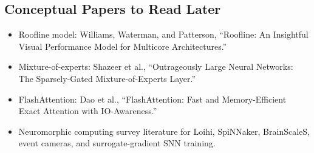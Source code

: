 \subsection*{Conceptual Papers to Read Later}
\begin{itemize}[leftmargin=*]
  \item Roofline model: Williams, Waterman, and Patterson, ``Roofline: An Insightful Visual Performance Model for Multicore Architectures.''
  \item Mixture-of-experts: Shazeer et al., ``Outrageously Large Neural Networks: The Sparsely-Gated Mixture-of-Experts Layer.''
  \item FlashAttention: Dao et al., ``FlashAttention: Fast and Memory-Efficient Exact Attention with IO-Awareness.''
  \item Neuromorphic computing survey literature for Loihi, SpiNNaker, BrainScaleS, event cameras, and surrogate-gradient SNN training.
\end{itemize}

\endgroup
